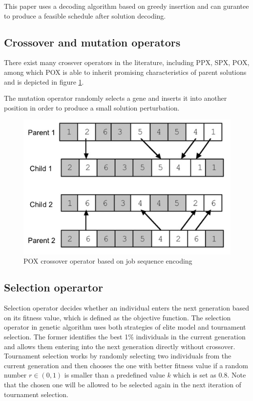 This paper uses a decoding algorithm based on greedy insertion and can gurantee to produce a feasible schedule after solution decoding.

\subsection{Crossover and mutation operators}
There exist many crossver operators in the literature, including PPX\cite{cheng1999tutorial4}, SPX\citep{wang2001effective5}, POX\citep{zhang6}, among which POX is able to inherit promising characteristics of parent solutions and is depicted in figure \ref{fig:fig1}.

The mutation operator randomly selects a gene and inserts it into another position in order to produce a small solution perturbation.


\begin{figure}[h!]
	\begin{center}
		\includegraphics[width=0.6\linewidth]{sections/figure1.jpg}
		\caption{POX crossover operator based on job sequence encoding}
		\label{fig:fig1}
	\end{center}
\end{figure}

\subsection{Selection operartor}
Selection operator decides whether an individual enters the next generation based on its fitness value, which is defined as the objective function.
The selection operator in genetic algorithm uses both strategies of elite model and tournament selection.
The former identifies the best 1\% individuals in the current generation and allows them entering into the next generation directly without crossover.
Tournament selection works by randomly selecting two individuals from the current generation and then chooses the one with better fitness value if a random number $r \in (0,1)$ is smaller than a predefined value $k$ which is set as 0.8. 
Note that the chosen one will be allowed to be selected again in the next iteration of tournament selection.



